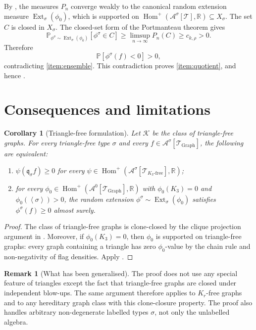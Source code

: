 \documentclass[11pt]{article}
\newtheorem{corollary}[theorem]{Corollary}
\theoremstyle{definition}
\newtheorem{remark}[theorem]{Remark}
\newcommand{\R}{\mathbb{R}}
\newcommand{\Prob}{\mathbb{P}}
\newcommand{\A}{\mathcal{A}}
\newcommand{\K}{\mathcal{K}}
\newcommand{\T}{\mathcal{T}}
\newcommand{\Homp}{\operatorname{Hom}^{+}}
\newcommand{\Ext}{\operatorname{Ext}}
\newcommand{\brak}[1]{\left\langle #1\right\rangle}
\newcommand{\q}{\mathfrak q}
\begin{document}
By , the measures $P_n$ converge weakly to the canonical
random extension measure $\Ext_\sigma(\phi_0)$, which is supported on
$\Homp(\A^\sigma[\T],\R)\subseteq X_\sigma$.  The set $C$ is closed in
$X_\sigma$.  The closed-set form of the Portmanteau theorem gives
\[
  \Prob_{\phi^\sigma\sim\Ext_\sigma(\phi_0)}[\phi^\sigma\in C]
  \ge
  \limsup_{n\to\infty} P_n(C)
  \ge c_{k,\rho}>0.
\]
Therefore
\[
  \Prob[\phi^\sigma(f)<0]>0,
\]
contradicting \ref{item:ensemble}.  This contradiction proves
\ref{item:quotient}, and hence .

\section{Consequences and limitations}

\begin{corollary}[Triangle-free formulation]
Let $\K$ be the class of triangle-free graphs.  For every triangle-free type
$\sigma$ and every $f\in\A^\sigma[\T_{\mathrm{Graph}}]$, the following are
equivalent:
\begin{enumerate}[label=\textup{(\alph*)}, leftmargin=2.8em]
  \item $\psi(\q_\sigma f)\ge0$ for every
  $\psi\in\Homp(\A^\sigma[\T_{K_3\text{-free}}],\R)$;
  \item for every $\phi_0\in\Homp(\A^0[\T_{\mathrm{Graph}}],\R)$ with
  $\phi_0(K_3)=0$ and $\phi_0(\brak\sigma)>0$, the random extension
  $\phi^\sigma\sim\Ext_\sigma(\phi_0)$ satisfies $\phi^\sigma(f)\ge0$ almost
  surely.
\end{enumerate}
\end{corollary}

\begin{proof}
The class of triangle-free graphs is clone-closed by the clique projection
argument in .  Moreover, if $\phi_0(K_3)=0$, then
$\phi_0$ is supported on triangle-free graphs: every graph containing a triangle
has zero $\phi_0$-value by the chain rule and non-negativity of flag densities.
Apply .
\end{proof}

\begin{remark}[What has been generalised]
The proof does not use any special feature of triangles except the fact that
triangle-free graphs are closed under independent blow-ups.  The same argument
therefore applies to $K_r$-free graphs and to any hereditary graph class with
this clone-closure property.  The proof also handles arbitrary non-degenerate
labelled types $\sigma$, not only the unlabelled algebra.
\end{remark}
\end{document}
